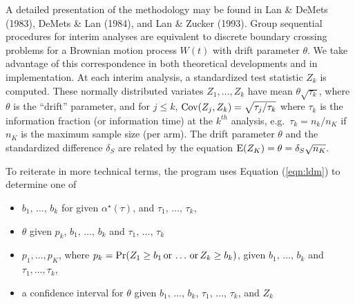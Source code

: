A detailed presentation of the methodology may be found in Lan \& DeMets
(1983), DeMets \& Lan (1984), and Lan \& Zucker (1993).  Group sequential
procedures for interim analyses are equivalent to discrete boundary
crossing problems for a Brownian motion process $W(t)$ with drift parameter
$\theta$.  We take advantage of this correspondence in both theoretical
developments and in implementation.  At each interim analysis, a
standardized test statistic $Z_k$ is computed.  These normally distributed
variates $Z_1, \ldots, Z_k$ have mean $\theta \sqrt{\tau_k}$, where $\theta$
is the ``drift'' parameter, and for $j \leq k$,
\begin{math}
  {\rm Cov}(Z_j,Z_k) = \sqrt{\tau_j / \tau_k}
\end{math}
where $\tau_k$ is the information fraction (or information time) at the
$k^{th}$ analysis, e.g.\ $\tau_k = n_k/n_K$ if $n_K$ is the maximum sample
size (per arm).  The drift parameter $\theta$ and the standardized
difference $\delta_S$ are related by the equation
\begin{math}
  {\rm E}(Z_K) = \theta = \delta_S \sqrt{n_K}.
\end{math}

To reiterate in more technical terms, the program uses Equation
(\ref{eqn:ldm}) to determine one of
\begin{itemize}
  \item $b_1,\,\ldots,\,b_k$
        for given $\alpha^{\star}(\tau)$, and $\tau_1,\,\ldots,\,\tau_k$, 

  \item $\theta$ given
        $p_k$, $b_1,\,\ldots,\,b_k$ and $\tau_1,\,\ldots,\,\tau_k$

  \item $p_1, \ldots, p_K$, where
        $p_k = \Pr(Z_1 \geq b_1 \, {\rm or} \, \ldots \, {\rm or} \, Z_k
        \geq b_k)$, 
        given $b_1,\,\ldots,\,b_k$ and $\tau_1, \ldots, \tau_k$,

  \item a confidence interval for $\theta$ given
        $b_1,\,\ldots,\,b_k$, $\tau_1,\,\ldots,\,\tau_k$,
        and $Z_k$
\end{itemize}


